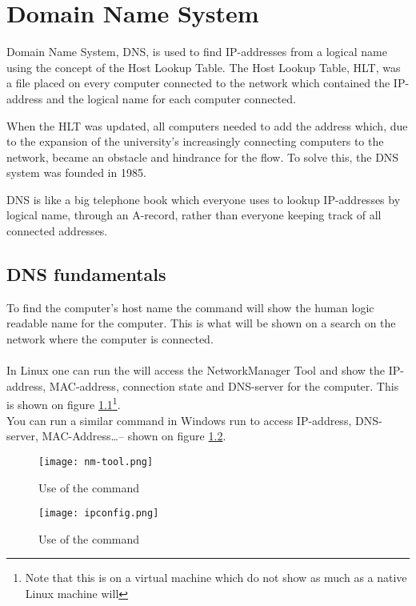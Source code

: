 \documentclass[Preamble]{subfiles}
\begin{document}
\chapter{Domain Name System}


Domain Name System, DNS, is used to find IP-addresses from a logical name using the concept of the Host Lookup Table.
The Host Lookup Table, HLT, was a file placed on every computer connected to the network which contained the IP-address and the logical name for each computer connected.

When the HLT was updated, all computers needed to add the address which, due to the expansion of the university's increasingly connecting computers to the network, became an obstacle and hindrance for the flow.
To solve this, the DNS system was founded in 1985.

DNS is like a big telephone book which everyone uses to lookup IP-addresses by logical name, through an A-record, rather than everyone keeping track of all connected addresses.



\section{DNS fundamentals}
To find the computer's host name the command  will show the human logic readable name for the computer.
This is what will be shown on a search on the network where the computer is connected.
\\
\\
In Linux one can run the  will access the NetworkManager Tool and show the IP-address, MAC-address, connection state and DNS-server for the computer.
This is shown on figure \ref{fig:nm-tool}\footnote{Note that this is on a virtual machine which do not show as much as a native Linux machine will}.
\\
You can run a similar command in Windows run  to access IP-address, DNS-server, MAC-Address\dots -- shown on figure \ref{fig:ipconfig}.


\begin{figure}[hbtp]
\centering
\texttt{[image: nm-tool.png]}
\caption{Use of the command }
\label{fig:nm-tool}
\end{figure}



\begin{figure}[hbtp]
\centering
\texttt{[image: ipconfig.png]}
\caption{Use of the command }
\label{fig:ipconfig}
\end{figure}
\end{document}
